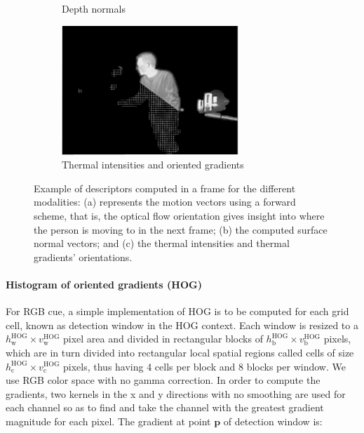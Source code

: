 \documentclass[10pt,twocolumn,letterpaper]{article}
\begin{document}
\begin{figure}
\begin{subfigure}[b]{0.45\textwidth}
                \caption{Depth normals}
                \label{fig:normals}
        \end{subfigure}
        \begin{subfigure}[b]{0.45\textwidth}
                \includegraphics[width=\textwidth]{hihog.png}
                \caption{Thermal intensities and oriented gradients}
                \label{fig:thermals}
        \end{subfigure}	
        \caption{Example of descriptors computed in a frame for the different modalities: (a) represents the motion vectors using a forward scheme, that is, the optical flow orientation gives insight into where the person is moving to in the next frame; (b) the computed surface normal vectors; and (c) the thermal intensities and thermal gradients' orientations. }\label{fig:descriptors}
\end{figure}

\paragraph{Histogram of oriented gradients (HOG)}
For RGB cue, a simple implementation of HOG \cite{dalal2005histograms} is to be computed for each grid cell, known as detection window in the HOG context. Each window is resized to a $h_\mathrm{w}^\mathrm{HOG} \times v_\mathrm{w}^\mathrm{HOG}$ pixel area and divided in rectangular blocks of $h_\mathrm{b}^\mathrm{HOG} \times v_\mathrm{b}^\mathrm{HOG}$ pixels, which are in turn divided into rectangular local spatial regions called cells of size $h_\mathrm{c}^\mathrm{HOG} \times v_\mathrm{c}^\mathrm{HOG}$ pixels, thus having 4 cells per block and 8 blocks per window. We use RGB color space with no gamma correction. In order to compute the gradients, two kernels in the x and y directions with no smoothing are used for each channel so as to find and take the channel with the greatest gradient magnitude for each pixel. The gradient at point $\mathbf{p}$ of detection window is:
\end{document}
